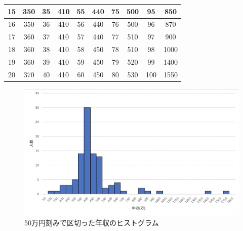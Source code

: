 \documentclass[12pt]{jarticle}
\begin{document}
\begin{table}
\begin{center}
\begin{tabular}[h!]{|c|c||c|c||c|c||c|c||c|c|}
            \hline
            15   & 350  & 35   & 410  & 55   & 440  & 75   & 500  & 95   & 850  \\
            \hline
            16   & 350  & 36   & 410  & 56   & 440  & 76   & 500  & 96   & 870  \\
            \hline
            17   & 360  & 37   & 410  & 57   & 440  & 77   & 510  & 97   & 900  \\
            \hline
            18   & 360  & 38   & 410  & 58   & 450  & 78   & 510  & 98   & 1000 \\
            \hline
            19   & 360  & 39   & 410  & 59   & 450  & 79   & 520  & 99   & 1400 \\
            \hline
            20   & 370  & 40   & 410  & 60   & 450  & 80   & 530  & 100  & 1550 \\
            \hline
        \end{tabular}
    \end{center}
\end{table}

\begin{figure}[h]
    \begin{center}
        \includegraphics[scale=0.7]{kadai4_graph3.png}
    \end{center}
    \caption{50万円刻みで区切った年収のヒストグラム}
    \label{fig3}
\end{figure}
\clearpage
\end{document}
